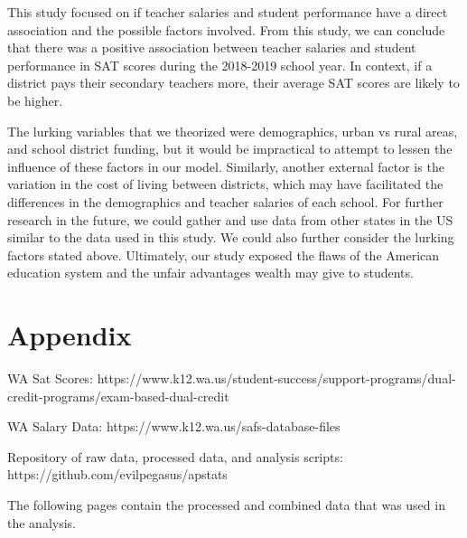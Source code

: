 \documentclass[11pt]{article} %
\begin{document}
This study focused on if teacher salaries and student performance have a direct association and the possible factors involved. From this study, we can conclude that there was a positive association between teacher salaries and student performance in SAT scores during the 2018-2019 school year. In context, if a district pays their secondary teachers more, their average SAT scores are likely to be higher.

The lurking variables that we theorized were demographics, urban vs rural areas, and school district funding, but it would be impractical to attempt to lessen the influence of these factors in our model. Similarly, another external factor is the variation in the cost of living between districts, which may have facilitated the differences in the demographics and teacher salaries of each school. For further research in the future, we could gather and use data from other states in the US similar to the data used in this study. We could also further consider the lurking factors stated above. Ultimately, our study exposed the flaws of the American education system and the unfair advantages wealth may give to students.

\section{Appendix}

WA Sat Scores: https://www.k12.wa.us/student-success/support-programs/dual-credit-programs/exam-based-dual-credit

\bigskip
\noindent WA Salary Data: https://www.k12.wa.us/safs-database-files

\bigskip
\noindent Repository of raw data, processed data, and analysis scripts: https://github.com/evilpegasus/apstats

\bigskip
\bigskip
\bigskip
\noindent The following pages contain the processed and combined data that was used in the analysis.
\end{document}
